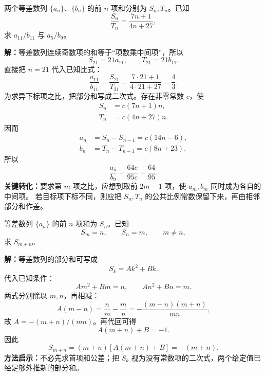 \begin{examplebox}
  两个等差数列 $\{a_n\}$、$\{b_n\}$ 的前 $n$ 项和分别为 $S_n,T_n$。已知
  \[
    \frac{S_n}{T_n}=\frac{7n+1}{4n+27},
  \]
  求 $a_{11}/b_{11}$ 与 $a_5/b_9$。

  \textbf{解：}等差数列连续奇数项的和等于“项数乘中间项”，所以
  \[
    S_{21}=21a_{11},\qquad T_{21}=21b_{11}.
  \]
  直接把 $n=21$ 代入已知比式：
  \[
    \frac{a_{11}}{b_{11}}
    =\frac{S_{21}}{T_{21}}
    =\frac{7\cdot21+1}{4\cdot21+27}
    =\boxed{\frac43}.
  \]
  为求异下标项之比，把部分和写成二次式。存在非零常数 $c$，使
  \begin{align*}
    S_n&=c(7n+1)n,\\
    T_n&=c(4n+27)n.
  \end{align*}
  因而
  \begin{align*}
    a_n&=S_n-S_{n-1}=c(14n-6),\\
    b_n&=T_n-T_{n-1}=c(8n+23).
  \end{align*}
  所以
  \[
    \frac{a_5}{b_9}=\frac{64c}{95c}=\boxed{\frac{64}{95}}.
  \]
  \textbf{关键转化：}要求第 $m$ 项之比，应想到取前 $2m-1$ 项，使 $a_m,b_m$ 同时成为各自的中间项。
  若目标项下标不同，则应把 $S_n,T_n$ 的公共比例常数保留下来，再由相邻部分和作差。
\end{examplebox}

\begin{examplebox}
  等差数列 $\{a_n\}$ 的前 $n$ 项和为 $S_n$。已知
  \[
    S_m=n,\qquad S_n=m,\qquad m\ne n,
  \]
  求 $S_{m+n}$。

  \textbf{解：}等差数列的部分和可写成
  \[
    S_k=Ak^2+Bk.
  \]
  代入已知条件：
  \[
    Am^2+Bm=n,\qquad An^2+Bn=m.
  \]
  两式分别除以 $m,n$，再相减：
  \[
    A(m-n)=\frac nm-\frac mn
      =-\frac{(m-n)(m+n)}{mn},
  \]
  故 $A=-(m+n)/(mn)$。再代回可得
  \[
    A(m+n)+B=-1.
  \]
  因此
  \[
    S_{m+n}=(m+n)[A(m+n)+B]
      =\boxed{-(m+n)}.
  \]
  \textbf{方法启示：}不必先求首项和公差；把 $S_k$ 视为没有常数项的二次式，两个给定值已经足够外推新的部分和。
\end{examplebox}

